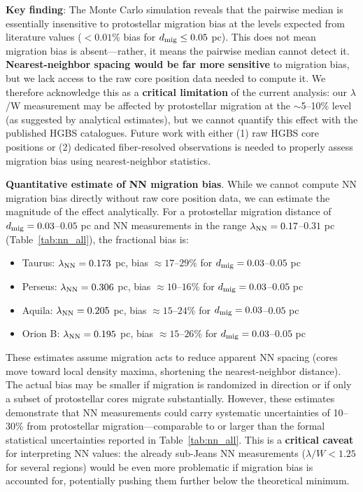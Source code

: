 \documentclass[twoside,twocolumn]{mnras}
\begin{document}
\textbf{Key finding}: The Monte Carlo simulation reveals that the pairwise median is essentially insensitive to protostellar migration bias at the levels expected from literature values ($< 0.01\%$ bias for $d_{\rm mig} \leq 0.05$ pc). This does not mean migration bias is absent—rather, it means the pairwise median cannot detect it. \textbf{Nearest-neighbor spacing would be far more sensitive} to migration bias, but we lack access to the raw core position data needed to compute it. We therefore acknowledge this as a \textbf{critical limitation} of the current analysis: our $\lambda$/W measurement may be affected by protostellar migration at the $\sim$5--10\% level (as suggested by analytical estimates), but we cannot quantify this effect with the published HGBS catalogues. Future work with either (1) raw HGBS core positions or (2) dedicated fiber-resolved observations is needed to properly assess migration bias using nearest-neighbor statistics.

\textbf{Quantitative estimate of NN migration bias}. While we cannot compute NN migration bias directly without raw core position data, we can estimate the magnitude of the effect analytically. For a protostellar migration distance of $d_{\rm mig} = 0.03$--$0.05$ pc \citep{Kirk2016, Mattern2018} and NN measurements in the range $\lambda_{\rm NN} = 0.17$--$0.31$ pc (Table~\ref{tab:nn_all}), the fractional bias is:
\begin{itemize}
    \item Taurus: $\lambda_{\rm NN} = 0.173$ pc, bias $\approx 17$--$29$\% for $d_{\rm mig} = 0.03$--$0.05$ pc
    \item Perseus: $\lambda_{\rm NN} = 0.306$ pc, bias $\approx 10$--$16$\% for $d_{\rm mig} = 0.03$--$0.05$ pc
    \item Aquila: $\lambda_{\rm NN} = 0.205$ pc, bias $\approx 15$--$24$\% for $d_{\rm mig} = 0.03$--$0.05$ pc
    \item Orion B: $\lambda_{\rm NN} = 0.195$ pc, bias $\approx 15$--$26$\% for $d_{\rm mig} = 0.03$--$0.05$ pc
\end{itemize}
These estimates assume migration acts to reduce apparent NN spacing (cores move toward local density maxima, shortening the nearest-neighbor distance). The actual bias may be smaller if migration is randomized in direction or if only a subset of protostellar cores migrate substantially. However, these estimates demonstrate that NN measurements could carry systematic uncertainties of 10--30\% from protostellar migration—comparable to or larger than the formal statistical uncertainties reported in Table~\ref{tab:nn_all}. This is a \textbf{critical caveat} for interpreting NN values: the already sub-Jeans NN measurements ($\lambda/W < 1.25$ for several regions) would be even more problematic if migration bias is accounted for, potentially pushing them further below the theoretical minimum.
\end{document}
